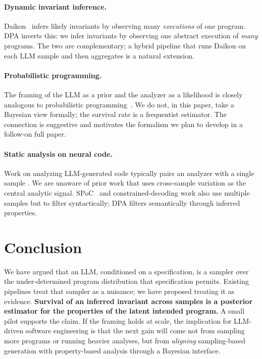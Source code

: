 \documentclass[sigconf,review,anonymous,nonacm]{acmart}
\begin{document}
\paragraph{Dynamic invariant inference.} Daikon~\cite{ernst2007daikon}
infers likely invariants by observing many \emph{executions} of one
program. DPA inverts this: we infer invariants by observing one
abstract execution of \emph{many} programs. The two are complementary;
a hybrid pipeline that runs Daikon on each LLM sample and then
aggregates is a natural extension.

\paragraph{Probabilistic programming.} The framing of the LLM as a prior
and the analyzer as a likelihood is closely analogous to probabilistic
programming~\cite{vandemeent2018ppintro}. We do not, in this paper,
take a Bayesian view formally; the survival rate is a frequentist
estimator. The connection is suggestive and motivates the formalism we
plan to develop in a follow-on full paper.

\paragraph{Static analysis on neural code.} Work on analyzing
LLM-generated code typically pairs an analyzer with a single sample
\cite{pearce2022copilotsec,sandoval2023llmsec}. We are unaware of prior
work that uses cross-sample variation as the central analytic signal.
SPoC~\cite{kulal2019spoc} and constrained-decoding work
\cite{poesia2022synchromesh} also use multiple samples but to filter
syntactically; DPA filters semantically through inferred properties.

\section{Conclusion}
\label{sec:conclusion}

We have argued that an LLM, conditioned on a specification, is a
sampler over the under-determined program distribution that
specification permits. Existing pipelines treat that sampler as a
nuisance; we have proposed treating it as evidence. \textbf{Survival of
an inferred invariant across samples is a posterior estimator for the
properties of the latent intended program.} A small pilot supports
the claim. If the framing holds at scale, the implication for
LLM-driven software engineering is that the next gain will come not
from sampling more programs or running heavier analyses, but from
\emph{aligning} sampling-based generation with property-based analysis
through a Bayesian interface.

\balance



\end{document}
